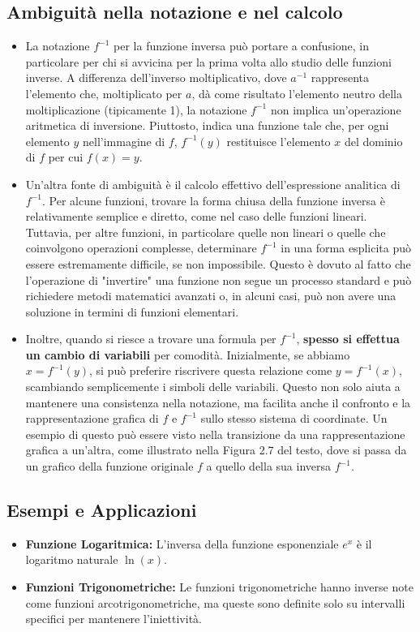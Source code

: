 \documentclass{book}
\begin{document}
\subsection{Ambiguità nella notazione e nel calcolo}
\begin{itemize}
    \item La notazione \( f^{-1} \) per la funzione inversa può portare a confusione, in particolare per chi si avvicina per la prima volta allo studio delle funzioni inverse. A differenza dell'inverso moltiplicativo, dove \( a^{-1} \) rappresenta l'elemento che, moltiplicato per \( a \), dà come risultato l'elemento neutro della moltiplicazione (tipicamente 1), la notazione \( f^{-1} \) non implica un'operazione aritmetica di inversione. Piuttosto, indica una funzione tale che, per ogni elemento \( y \) nell'immagine di \( f \), \( f^{-1}(y) \) restituisce l'elemento \( x \) del dominio di \( f \) per cui \( f(x) = y \).
    \item Un'altra fonte di ambiguità è il calcolo effettivo dell'espressione analitica di \( f^{-1} \). Per alcune funzioni, trovare la forma chiusa della funzione inversa è relativamente semplice e diretto, come nel caso delle funzioni lineari. Tuttavia, per altre funzioni, in particolare quelle non lineari o quelle che coinvolgono operazioni complesse, determinare \( f^{-1} \) in una forma esplicita può essere estremamente difficile, se non impossibile. Questo è dovuto al fatto che l'operazione di "invertire" una funzione non segue un processo standard e può richiedere metodi matematici avanzati o, in alcuni casi, può non avere una soluzione in termini di funzioni elementari.
    \item Inoltre, quando si riesce a trovare una formula per \( f^{-1} \), \textbf{spesso si effettua un cambio di variabili} per comodità. Inizialmente, se abbiamo \( x = f^{-1}(y) \), si può preferire riscrivere questa relazione come \( y = f^{-1}(x) \), scambiando semplicemente i simboli delle variabili. Questo non solo aiuta a mantenere una consistenza nella notazione, ma facilita anche il confronto e la rappresentazione grafica di \( f \) e \( f^{-1} \) sullo stesso sistema di coordinate. Un esempio di questo può essere visto nella transizione da una rappresentazione grafica a un'altra, come illustrato nella Figura 2.7 del testo, dove si passa da un grafico della funzione originale \( f \) a quello della sua inversa \( f^{-1} \).

\end{itemize}
\subsection{Esempi e Applicazioni}
\begin{itemize}
    \item \textbf{Funzione Logaritmica:} L'inversa della funzione esponenziale \( e^x \) è il logaritmo naturale \( \ln(x) \).
    \item \textbf{Funzioni Trigonometriche:} Le funzioni trigonometriche hanno inverse note come funzioni arcotrigonometriche, ma queste sono definite solo su intervalli specifici per mantenere l'iniettività.
\end{itemize}
\end{document}
